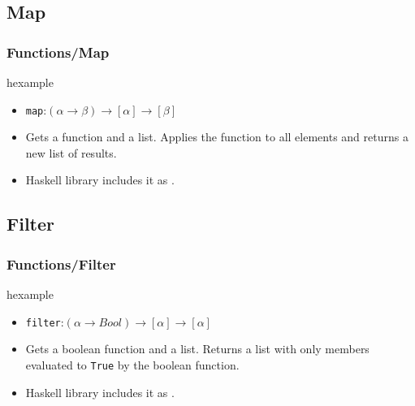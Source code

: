 \subsection{Map}
\begin{frame}
\frametitle{Functions/Map}
\begin{beamercolorbox}{hexample}
\codemapH
\end{beamercolorbox}
\begin{itemize}
 \item \texttt{map}:$(\alpha \rightarrow \beta) \rightarrow [\alpha] \rightarrow  [\beta]$
 \item Gets a function and a list. Applies the function to all elements and 
 returns a new list of results.
 \item Haskell library includes it as .
\end{itemize}
\end{frame}


\subsection{Filter}
\begin{frame}
\frametitle{Functions/Filter}
\begin{beamercolorbox}{hexample}
\codefilterH
\end{beamercolorbox}
\begin{itemize}
 \item \texttt{filter}:$(\alpha \rightarrow Bool) \rightarrow [\alpha] \rightarrow  [\alpha]$
 \item Gets a boolean function and a list. Returns a list with only members
 evaluated to \texttt{True} by the boolean function.
 \item Haskell library includes it as .

\end{itemize}
\end{frame}

